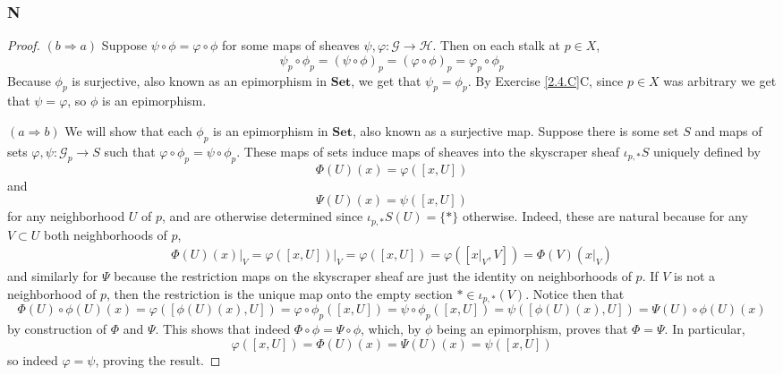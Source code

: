 \documentclass{article}
\newcommand{\fG}{\mathscr{G}}
\newcommand{\fH}{\mathscr{H}}
\newcommand{\Set}{\mathbf{Set}} %
\begin{document}
\subsubsection{N}\label{2.4.N}
\begin{proof}
    \item [$(b\Rightarrow a)$]
    Suppose $\psi \circ \phi=\varphi \circ \phi$ for some maps of sheaves $\psi,\varphi:\fG\to \fH$. Then on each stalk at $p\in X$,
    \[
    \psi_p\circ \phi_p=(\psi \circ \phi)_p=(\varphi\circ \phi)_p=\varphi_p\circ \phi_p
    \]
    Because $\phi_p$ is surjective, also known as an epimorphism in $\Set$, we get that $\psi_p=\phi_p$. By Exercise \ref{2.4.C}C, since $p\in X$ was arbitrary we get that $\psi=\varphi$, so $\phi$ is an epimorphism.
    \item [$(a\Rightarrow b)$]
    We will show that each $\phi_p$ is an epimorphism in $\Set$, also known as a surjective map. Suppose there is some set $S$ and maps of sets $\varphi, \psi:\fG_p\to S$ such that $\varphi \circ \phi_p=\psi\circ \phi_p$. These maps of sets induce maps of sheaves into the skyscraper sheaf $\iota_{p,*}S$ uniquely defined by
    \[
    \Phi(U)(x)=\varphi([x,U])
    \]
    and
    \[
    \Psi(U)(x)=\psi([x,U])
    \]
    for any neighborhood $U$ of $p$, and are otherwise determined since $\iota_{p,*}S(U)=\{*\}$ otherwise. Indeed, these are natural because for any $V\subset U$ both neighborhoods of $p$,
    \begin{align*}
        \Phi(U)(x)\vert_V=\varphi([x,U])\vert_V=\varphi([x,U])=\varphi([x\vert_V,V])=\Phi(V)(x\vert_V)
    \end{align*}
    and similarly for $\Psi$ because the restriction maps on the skyscraper sheaf are just the identity on neighborhoods of $p$. If $V$ is not a neighborhood of $p$, then the restriction is the unique map onto the empty section $*\in \iota_{p,*}(V)$. Notice then that
    \[
    \Phi(U)\circ \phi(U)(x)=\varphi([\phi(U)(x),U])=\varphi \circ \phi_p([x,U])=\psi\circ \phi_p([x,U])=\psi([\phi(U)(x),U])=\Psi(U)\circ \phi(U)(x)
    \]
    by construction of $\Phi$ and $\Psi$. This shows that indeed $\Phi\circ \phi =\Psi \circ \phi$, which, by $\phi$ being an epimorphism, proves that $\Phi=\Psi$. In particular,
    \[
    \varphi([x,U])=\Phi(U)(x)=\Psi(U)(x)=\psi([x,U])
    \]
    so indeed $\varphi=\psi$, proving the result.
\end{proof}
\end{document}

